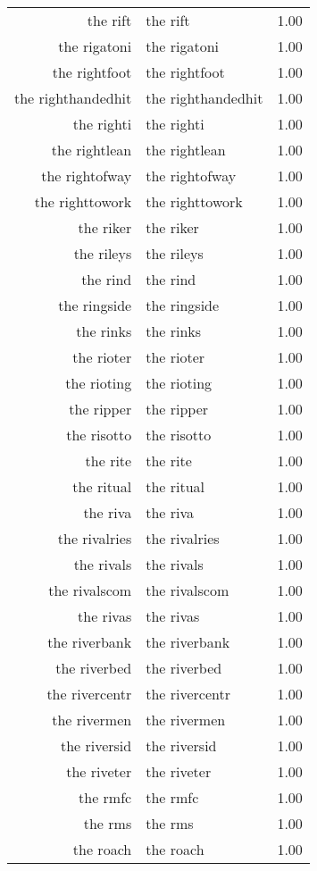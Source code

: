 \begin{table}[ht]
\begin{tabular}{rlr}
  the rift & the rift & 1.00 \\ 
  the rigatoni & the rigatoni & 1.00 \\ 
  the rightfoot & the rightfoot & 1.00 \\ 
  the righthandedhit & the righthandedhit & 1.00 \\ 
  the righti & the righti & 1.00 \\ 
  the rightlean & the rightlean & 1.00 \\ 
  the rightofway & the rightofway & 1.00 \\ 
  the righttowork & the righttowork & 1.00 \\ 
  the riker & the riker & 1.00 \\ 
  the rileys & the rileys & 1.00 \\ 
  the rind & the rind & 1.00 \\ 
  the ringside & the ringside & 1.00 \\ 
  the rinks & the rinks & 1.00 \\ 
  the rioter & the rioter & 1.00 \\ 
  the rioting & the rioting & 1.00 \\ 
  the ripper & the ripper & 1.00 \\ 
  the risotto & the risotto & 1.00 \\ 
  the rite & the rite & 1.00 \\ 
  the ritual & the ritual & 1.00 \\ 
  the riva & the riva & 1.00 \\ 
  the rivalries & the rivalries & 1.00 \\ 
  the rivals & the rivals & 1.00 \\ 
  the rivalscom & the rivalscom & 1.00 \\ 
  the rivas & the rivas & 1.00 \\ 
  the riverbank & the riverbank & 1.00 \\ 
  the riverbed & the riverbed & 1.00 \\ 
  the rivercentr & the rivercentr & 1.00 \\ 
  the rivermen & the rivermen & 1.00 \\ 
  the riversid & the riversid & 1.00 \\ 
  the riveter & the riveter & 1.00 \\ 
  the rmfc & the rmfc & 1.00 \\ 
  the rms & the rms & 1.00 \\ 
  the roach & the roach & 1.00 \\ 

\end{tabular}
\end{table}
